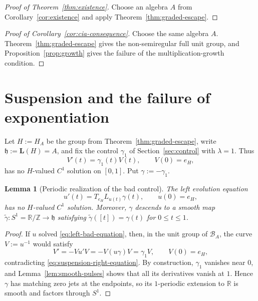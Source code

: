 \documentclass[11pt]{article}
\newtheorem{lemma}[theorem]{Lemma}
\theoremstyle{remark}
\begin{document}
\begin{proof}[Proof of Theorem~\ref{thm:existence}]
Choose an algebra $A$ from Corollary~\ref{cor:existence} and apply
Theorem~\ref{thm:graded-escape}.
\end{proof}

\begin{proof}[Proof of Corollary~\ref{cor:cia-consequence}]
Choose the same algebra $A$.  Theorem~\ref{thm:graded-escape} gives the
non-semiregular full unit group, and Proposition~\ref{prop:growth} gives the
failure of the multiplication-growth condition.
\end{proof}











\section{Suspension and the failure of exponentiation}
\label{sec:suspension}

Let $H:=H_A$ be the group from Theorem~\ref{thm:graded-escape}, write
$\mathfrak h:=\mathbf L(H)=A$, and fix the control $\gamma_1$ of
Section~\ref{sec:control} with $\lambda=1$.  Thus
\begin{equation}
  V'(t)=\gamma_1(t)V(t),
  \qquad V(0)=e_H,
  \label{eq:suspension-right-equation}
\end{equation}
has no $H$-valued $C^1$ solution on $[0,1]$.  Put
$\gamma:=-\gamma_1$.

\begin{lemma}[Periodic realization of the bad control]
\label{lem:periodic-bad-control}
The left evolution equation
\begin{equation}
  u'(t)=T_{e_H}L_{u(t)}\gamma(t),
  \qquad u(0)=e_H,
  \label{eq:left-bad-equation}
\end{equation}
has no $H$-valued $C^1$ solution.  Moreover, $\gamma$ descends to a smooth
map $\widetilde\gamma:S^1=\mathbb R/\mathbb Z\to\mathfrak h$ satisfying
$\widetilde\gamma([t])=\gamma(t)$ for $0\leq t\leq1$.
\end{lemma}

\begin{proof}
If $u$ solved \eqref{eq:left-bad-equation}, then, in the unit group of
$\mathcal B_A$, the curve $V:=u^{-1}$ would satisfy
\[
  V'=-Vu'V=-V(u\gamma)V=\gamma_1V,
  \qquad V(0)=e_H,
\]
contradicting \eqref{eq:suspension-right-equation}.  By construction,
$\gamma_1$ vanishes near $0$, and Lemma~\ref{lem:smooth-pulses} shows that
all its derivatives vanish at $1$.  Hence $\gamma$ has matching zero jets at
the endpoints, so its $1$-periodic extension to $\mathbb R$ is smooth and
factors through $S^1$.
\end{proof}
\end{document}
